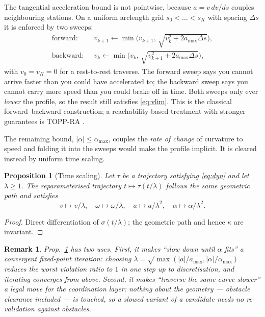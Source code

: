 \documentclass[conference]{IEEEtran}
\newtheorem{proposition}{Proposition}
\newtheorem{remark}{Remark}
\begin{document}
The tangential acceleration bound is not pointwise, because $a = v\,dv/ds$ couples
neighbouring stations. On a uniform arclength grid $s_0 < \dots < s_K$ with spacing
$\Delta s$ it is enforced by two sweeps:
\begin{align}
  \text{forward: } \; & v_{k+1} \leftarrow \min\!\big(v_{k+1},\, \sqrt{v_k^2 + 2 a_{\max}\Delta s}\big),
  \label{eq:fwd}\\
  \text{backward: } \; & v_{k} \leftarrow \min\!\big(v_{k},\, \sqrt{v_{k+1}^2 + 2 a_{\max}\Delta s}\big),
  \label{eq:bwd}
\end{align}
with $v_0 = v_K = 0$ for a rest-to-rest traverse. The forward sweep says you cannot arrive
faster than you could have accelerated to; the backward sweep says you cannot carry more
speed than you could brake off in time. Both sweeps only ever \emph{lower} the profile, so
the result still satisfies \eqref{eq:vlim}. This is the classical forward--backward
construction; a reachability-based treatment with stronger guarantees is TOPP-RA
\cite{toppra2018}.

The remaining bound, $|\alpha| \le \alpha_{\max}$, couples the \emph{rate of change} of
curvature to speed and folding it into the sweeps would make the profile implicit. It is
cleared instead by uniform time scaling.

\begin{proposition}[Time scaling]
\label{prop:scale}
Let $\tau$ be a trajectory satisfying \eqref{eq:dyn} and let $\lambda \ge 1$. The
reparameterised trajectory $t \mapsto \tau(t/\lambda)$ follows the \emph{same geometric
path} and satisfies
\[
  v \mapsto v/\lambda, \quad \omega \mapsto \omega/\lambda, \quad
  a \mapsto a/\lambda^2, \quad \alpha \mapsto \alpha/\lambda^2 .
\]
\end{proposition}

\begin{proof}
Direct differentiation of $\sigma(t/\lambda)$; the geometric path and hence $\kappa$ are
invariant.
\end{proof}

\begin{remark}
Prop.~\ref{prop:scale} has two uses. First, it makes ``slow down until $\alpha$ fits'' a
convergent fixed-point iteration: choosing
$\lambda = \sqrt{\max(|a|/a_{\max}, |\alpha|/\alpha_{\max})}$ reduces the worst violation
ratio to $1$ in one step up to discretisation, and iterating converges from above. Second,
it makes ``traverse the same curve slower'' a legal move for the \emph{coordination} layer:
nothing about the geometry --- obstacle clearance included --- is touched, so a slowed
variant of a candidate needs no re-validation against obstacles.
\end{remark}
\end{document}
